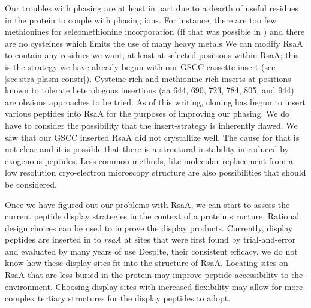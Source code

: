 Our troubles with phasing are at least in part due to a dearth of useful residues in the protein to couple with phasing ions. For instance, there are too few methionines for seleomethionine incorporation (if that was possible in \caulobacter{}) and there are no cysteines which limits the use of many heavy metals We can modify RsaA to contain any residues we want, at least at selected positions within RsaA; this is the strategy we have already begun with our GSCC cassette insert (see \cref{sec:stra-plasm-constr}). Cysteine-rich and methionine-rich inserts at positions known to tolerate heterologous insertions (\eg \ac{aa} 644, 690, 723, 784, 805, and 944) are obvious approaches to be tried. As of this writing, cloning has begun to insert various peptides into RsaA for the purposes of improving our phasing. We do have to consider the possibility that the insert-strategy is inherently flawed. We saw that our GSCC inserted RsaA did not crystallize well. The cause for that is not clear and it is possible that there is a structural instability introduced by exogenous peptides. Less common methods, like molecular replacement from a low resolution cryo-electron microscopy structure are also possibilities that should be considered. 

Once we have figured out our problems with RsaA, we can start to assess the
current peptide display strategies in the context of a protein  structure.
Rational design choices can be used to improve the display products. Currently, display peptides are inserted in to \textit{rsaA} at sites that were first found by trial-and-error and evaluated by many years of use Despite, their consistent efficacy, we do not know how these display sites fit into the structure of RsaA. Locating sites on RsaA that are less buried in the protein may improve peptide accessibility to the environment. Choosing display sites with increased flexibility may allow for more complex tertiary structures for the display peptides to adopt. 


